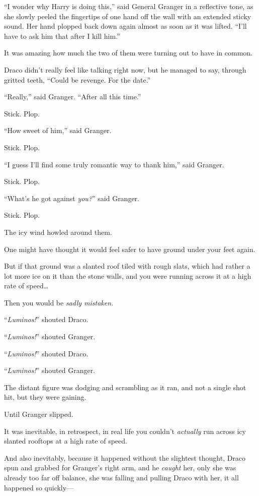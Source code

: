 “I wonder why Harry is doing this,” said General Granger in a reflective tone, as she slowly peeled the fingertips of one hand off the wall with an extended sticky sound. Her hand plopped back down again almost as soon as it was lifted. “I’ll have to ask him that after I kill him.”

It was amazing how much the two of them were turning out to have in common.

Draco didn’t really feel like talking right now, but he managed to say, through gritted teeth, “Could be revenge. For the date.”

“Really,” said Granger. “After all this time.”

Stick. Plop.

“How sweet of him,” said Granger.

Stick. Plop.

“I guess I’ll find some truly romantic way to thank him,” said Granger.

Stick. Plop.

“What’s he got against \emph{you?}” said Granger.

Stick. Plop.

The icy wind howled around them.

\later

One might have thought it would feel safer to have ground under your feet again.

But if that ground was a slanted roof tiled with rough slats, which had rather a lot more ice on it than the stone walls, and you were running across it at a high rate of speed…

Then you would be \emph{sadly mistaken.}

“\emph{Luminos!}” shouted Draco.

“\emph{Luminos!}” shouted Granger.

“\emph{Luminos!}” shouted Draco.

“\emph{Luminos!}” shouted Granger.

The distant figure was dodging and scrambling as it ran, and not a single shot hit, but they were gaining.

Until Granger slipped.

It was inevitable, in retrospect, in real life you couldn’t \emph{actually} run across icy slanted rooftops at a high rate of speed.

And also inevitably, because it happened without the slightest thought, Draco spun and grabbed for Granger’s right arm, and he \emph{caught} her, only she was already too far off balance, she was falling and pulling Draco with her, it all happened so quickly—

